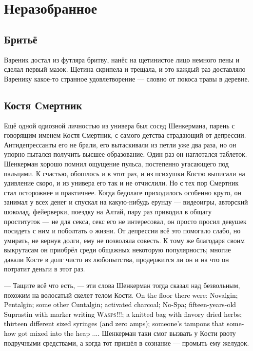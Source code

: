 \documentclass[a4paper,10pt,fleqn]{book}\usepackage{polyglossia}\setdefaultlanguage{english}\setotherlanguage{russian}\defaultfontfeatures{Ligatures=TeX,Mapping=tex-text} \usepackage{xcolor}\definecolor{lightgray}{HTML}{bbbbbb}\color{lightgray}\newcommand{\ml}[3]{\textcolor{black}{#3}}
\begin{document}
\chapter{Неразобранное}

\section{Бритьё}

Вареник достал из футляра бритву, нанёс на щетинистое лицо немного пены и сделал первый мазок.
Щетина скрипела и трещала, и это каждый раз доставляло Варенику какое-то странное удовлетворение --- словно от покоса травы в деревне.

\section{Костя Смертник}

Ещё одной одиозной личностью из универа был сосед Шенкермана, парень с говорящим именем Костя Смертник, с самого детства страдающий от депрессии.
Антидепрессанты его не брали, его вытаскивали из петли уже два раза, но он упорно пытался получить высшее образование.
Один раз он наглотался таблеток.
Шенкерман хорошо помнил ощущение пульса, постепенно угасающего под пальцами.
К счастью, обошлось и в этот раз, и из психушки Костю выписали на удивление скоро, и из универа его так и не отчислили.
Но с тех пор Смертник стал осторожнее и практичнее.
Когда бедолаге приходилось особенно круто, он занимал у всех денег и спускал на какую-нибудь ерунду --- видеоигры, авторский шоколад, фейерверки, поездку на Алтай, пару раз приводил в общагу проституток --- не для секса, секс его не интересовал, он просто просил девушек посидеть с ним и поболтать о жизни.
От депрессии всё это помогало слабо, но умирать, не вернув долги, ему не позволяла совесть.
К тому же благодаря своим выкрутасам он приобрёл среди общажных некоторую популярность;
многие давали Косте в долг чисто из любопытства, продержится ли он и на что он потратит деньги в этот раз.

--- Тащите всё что есть, --- эти слова Шенкерман тогда сказал над безвольным, похожим на волосатый скелет телом Кости.
\ml{$0$}
{На пол посыпались таблетки анальгина, пенталгина, ещё какого-то хуелгина, активированный уголь, ношпа, супрастин пятнадцатилетней давности с надписью маркером <<ОСЫ!!!>>, вязаный мешочек с пахучей сушёной травой,
 тринадцать разнокалиберных шприцов (и ни одной ампулы), чьи-то случайно затесавшиеся тампоны...}
{On the floor there were: Novalgin; Pentalgin; some other Cuntalgin; activated charcoal; No-Spa; fifteen-years-old Suprastin with marker writing \textsc{Wasps!!!}; a knitted bag with flavory dried herbs; thirteen different sized syringes (and zero amps); someone's tampons that somehow got mixed into the heap ....}
Шенкерман таки смог вызвать у Кости рвоту подручными средствами, а когда тот пришёл в сознание --- промыть ему желудок.
\end{document}
